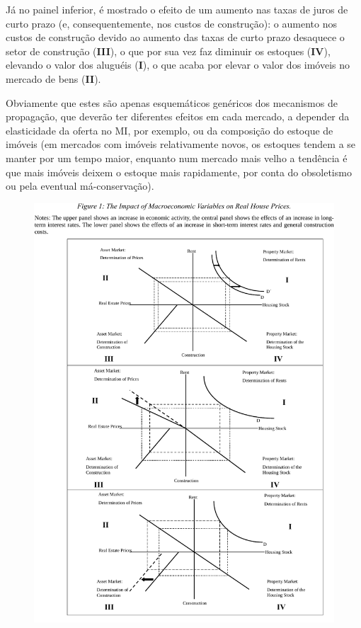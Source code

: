 \documentclass[
	12pt,				%
	oneside,			%
	a4paper,			%
	chapter=TITLE,		%
	section=TITLE,		%
	english,			%
	brazil				%
	]{abntex2}
\begin{document}
\begin{refsection}
Já no painel inferior, é mostrado o efeito de um aumento nas taxas de juros de
curto prazo (e, consequentemente, nos custos de construção): o aumento nos
custos de construção devido ao aumento das taxas de curto prazo desaquece o
setor de construção (\textbf{III}), o que por sua vez faz diminuir os estoques
(\textbf{IV}), elevando o valor dos aluguéis (\textbf{I}), o que acaba por elevar o valor
dos imóveis no mercado de bens (\textbf{II}).

Obviamente que estes são apenas esquemáticos genéricos dos mecanismos de
propagação, que deverão ter diferentes efeitos em cada mercado, a depender da
elasticidade da oferta no \gls{MI}, por exemplo, ou da composição do estoque de
imóveis (em mercados com imóveis relativamente novos, os estoques tendem a se
manter por um tempo maior, enquanto num mercado mais velho a tendência é que
mais imóveis deixem o estoque mais rapidamente, por conta do obsoletismo ou pela
eventual má-conservação).
\begin{figure}[H]

{\centering \includegraphics[width=\textwidth]{./images/adams_crop} 

}
\end{figure}
\end{refsection}
\end{document}

